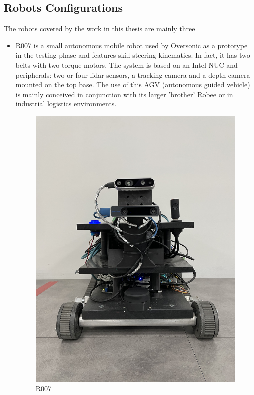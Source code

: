 \subsection{Robots Configurations}
The robots covered by the work in this thesis are mainly three 
\begin{itemize}
    \item R007 is a small autonomous mobile robot used by Oversonic as a prototype in the testing phase and features skid steering kinematics. In fact, it has two belts with two torque motors. The system is based on an Intel NUC and peripherals: two or four lidar sensors, a tracking camera and a depth camera mounted on the top base. The use of this AGV (autonomous guided vehicle) is mainly conceived in conjunction with its larger 'brother' Robee or in industrial logistics environments.
    \begin{figure}[H]
        \centering
        \includegraphics[scale=0.05]{Images/Chapter 3/r007.jpg}
        \caption{R007}

\end{figure}
\end{itemize}
